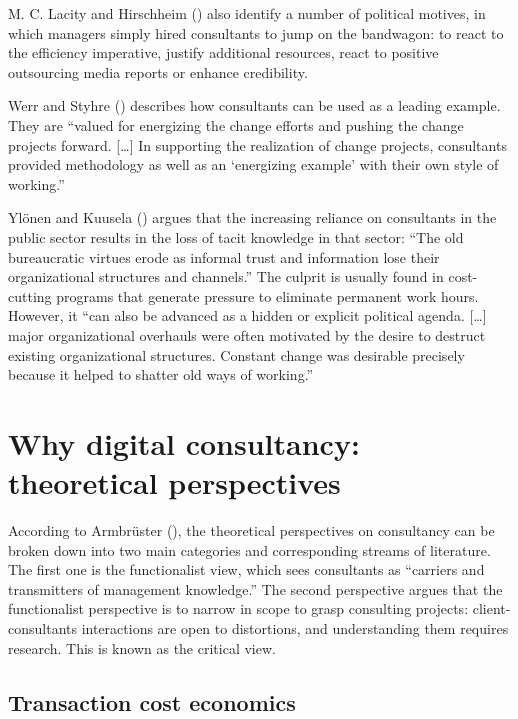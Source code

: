 \documentclass[
  man,floatsintext]{apa6}
\begin{document}
M. C. Lacity and Hirschheim () also identify a number of political motives, in which managers simply hired consultants to jump on the bandwagon: to react to the efficiency imperative, justify additional resources, react to positive outsourcing media reports or enhance credibility.

Werr and Styhre () describes how consultants can be used as a leading example. They are ``valued for energizing the change efforts and pushing the change projects forward. {[}\ldots{]} In supporting the realization of change projects, consultants provided methodology as well as an `energizing example' with their own style of working.''

Ylönen and Kuusela () argues that the increasing reliance on consultants in the public sector results in the loss of tacit knowledge in that sector: ``The old bureaucratic virtues erode as informal trust and information lose their organizational structures and channels.'' The culprit is usually found in cost-cutting programs that generate pressure to eliminate permanent work hours. However, it ``can also be advanced as a hidden or explicit political agenda. {[}\ldots{]} major organizational overhauls were often motivated by the desire to destruct existing organizational structures. Constant change was desirable precisely because it helped to shatter old ways of working.''

\section{Why digital consultancy: theoretical perspectives}\label{why-digital-consultancy-theoretical-perspectives}

According to Armbrüster (), the theoretical perspectives on consultancy can be broken down into two main categories and corresponding streams of literature. The first one is the functionalist view, which sees consultants as ``carriers and transmitters of management knowledge.'' The second perspective argues that the functionalist perspective is to narrow in scope to grasp consulting projects: client-consultants interactions are open to distortions, and understanding them requires research. This is known as the critical view.

\subsection{Transaction cost economics}\label{transaction-cost-economics}
\end{document}
